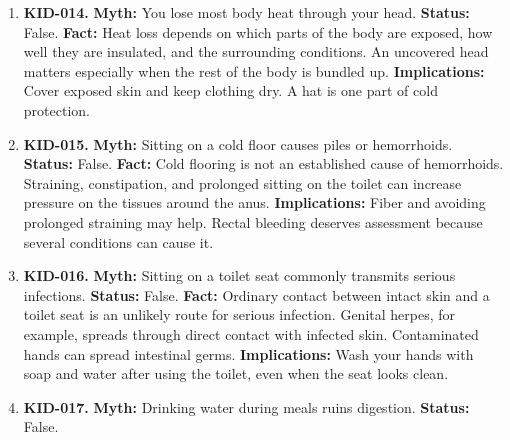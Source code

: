 \documentclass[11pt,oneside]{book}
\begin{document}
\begin{enumerate}[leftmargin=0pt,labelwidth=0pt,labelsep=0pt,itemindent=0pt]
\textbf{Status:} False.\newline
\textbf{Fact:} After death, skin around the nails can lose moisture and retract, exposing more of the nail. This creates the appearance of growth. \cite{ref208}\newline
\textbf{Implications:} A more prominent nail after death can be explained by changes in the surrounding skin.
\item[] \textbf{KID-014.} \textbf{Myth:} You lose most body heat through your head.\newline
\textbf{Status:} False.\newline
\textbf{Fact:} Heat loss depends on which parts of the body are exposed, how well they are insulated, and the surrounding conditions. An uncovered head matters especially when the rest of the body is bundled up. \cite{ref212}\newline
\textbf{Implications:} Cover exposed skin and keep clothing dry. A hat is one part of cold protection.
\item[] \textbf{KID-015.} \textbf{Myth:} Sitting on a cold floor causes piles or hemorrhoids.\newline
\textbf{Status:} False.\newline
\textbf{Fact:} Cold flooring is not an established cause of hemorrhoids. Straining, constipation, and prolonged sitting on the toilet can increase pressure on the tissues around the anus. \cite{ref347}\newline
\textbf{Implications:} Fiber and avoiding prolonged straining may help. Rectal bleeding deserves assessment because several conditions can cause it.
\item[] \textbf{KID-016.} \textbf{Myth:} Sitting on a toilet seat commonly transmits serious infections.\newline
\textbf{Status:} False.\newline
\textbf{Fact:} Ordinary contact between intact skin and a toilet seat is an unlikely route for serious infection. Genital herpes, for example, spreads through direct contact with infected skin. Contaminated hands can spread intestinal germs. \cite{ref348,ref315}\newline
\textbf{Implications:} Wash your hands with soap and water after using the toilet, even when the seat looks clean.
\item[] \textbf{KID-017.} \textbf{Myth:} Drinking water during meals ruins digestion.\newline
\textbf{Status:} False.\newline

\end{enumerate}
\end{document}
